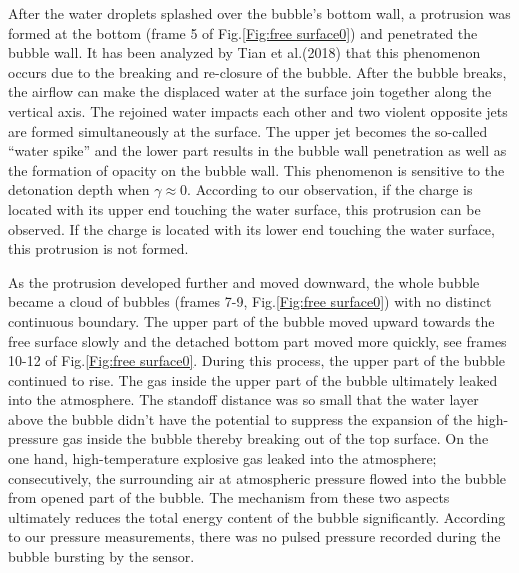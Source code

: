 \documentclass[%
 aip,
 amsmath,amssymb,
 reprint,%
]{revtex4-1}
\begin{document}
{\begin{figure}
\end{figure}
After the water droplets splashed over the bubble's bottom wall, a protrusion was formed at the bottom (frame 5 of Fig.\ref{Fig:free surface0}) and penetrated the bubble wall. It has been analyzed by Tian et al.(2018)\cite{RN2405} that this phenomenon occurs due to the breaking and re-closure of the bubble. After the bubble breaks, the airflow can make the displaced water at the surface join together along the vertical axis. The rejoined water impacts each other and two violent opposite jets are formed simultaneously at the surface. The upper jet becomes the so-called ``water spike'' and the lower part results in the bubble wall penetration as well as the formation of opacity on the bubble wall. This phenomenon is sensitive to the detonation depth when $\gamma\approx 0$. According to our observation, if the charge is located with its upper end touching the water surface, this protrusion can be observed. If the charge is located with its lower end touching the water surface, this protrusion is not formed. 

As the protrusion developed further and moved downward, the whole bubble became a cloud of bubbles (frames 7-9, Fig.\ref{Fig:free surface0}) with no distinct continuous boundary. The upper part of the bubble moved upward towards the free surface slowly and the detached bottom part moved more quickly, see frames 10-12 of Fig.\ref{Fig:free surface0}. During this process, the upper part of the bubble continued to rise. The gas inside the upper part of the bubble ultimately leaked into the atmosphere. The standoff distance was so small that the water layer above the bubble didn't have the potential to suppress the expansion of the high-pressure gas inside the bubble thereby breaking out of the top surface. On the one hand, high-temperature explosive gas leaked into the atmosphere; consecutively, the surrounding air at atmospheric pressure flowed into the bubble from opened part of the bubble. The mechanism from these two aspects ultimately reduces the total energy content of the bubble significantly. According to our pressure measurements, there was no pulsed pressure recorded during the bubble bursting by the sensor. 

}
\end{document}
